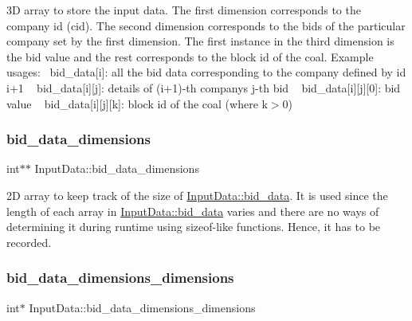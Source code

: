 3D array to store the input data. The first dimension corresponds to the company id (cid). The second dimension corresponds to the bids of the particular company set by the first dimension. The first instance in the third dimension is the bid value and the rest corresponds to the block id of the coal. Example usages\+:~\newline
 bid\+\_\+data\mbox{[}i\mbox{]}\+: all the bid data corresponding to the company defined by id i+1 ~\newline
 bid\+\_\+data\mbox{[}i\mbox{]}\mbox{[}j\mbox{]}\+: details of (i+1)-\/th company\textquotesingle{}s j-\/th bid ~\newline
 bid\+\_\+data\mbox{[}i\mbox{]}\mbox{[}j\mbox{]}\mbox{[}0\mbox{]}\+: bid value ~\newline
 bid\+\_\+data\mbox{[}i\mbox{]}\mbox{[}j\mbox{]}\mbox{[}k\mbox{]}\+: block id of the coal (where k$>$0) \mbox{\label{structInputData_abb16dba9ad2a732ace6dab1b1c9dec33}} 
\subsubsection{\texorpdfstring{bid\+\_\+data\+\_\+dimensions}{bid\_data\_dimensions}}
{\footnotesize\ttfamily int$\ast$$\ast$ Input\+Data\+::bid\+\_\+data\+\_\+dimensions}

2D array to keep track of the size of \hyperlink{structInputData_a1dafb844546b53fd739be0f370676d28}{Input\+Data\+::bid\+\_\+data}. It is used since the length of each array in \hyperlink{structInputData_a1dafb844546b53fd739be0f370676d28}{Input\+Data\+::bid\+\_\+data} varies and there are no ways of determining it during runtime using sizeof-\/like functions. Hence, it has to be recorded. \mbox{\label{structInputData_a9ae50cca01b0b05cb38c55c328fc19fd}} 
\subsubsection{\texorpdfstring{bid\+\_\+data\+\_\+dimensions\+\_\+dimensions}{bid\_data\_dimensions\_dimensions}}
{\footnotesize\ttfamily int$\ast$ Input\+Data\+::bid\+\_\+data\+\_\+dimensions\+\_\+dimensions}

